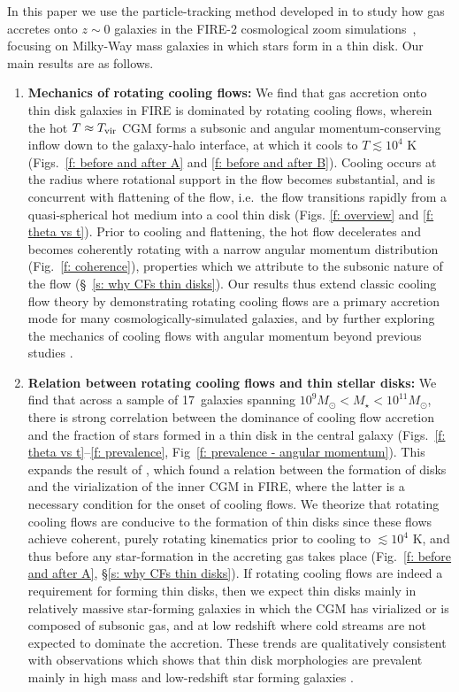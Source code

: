 \documentclass[fleqn,usenatbib]{mnras}
\newcommand{\Nsample}{17}
\begin{document}
In this paper we use the particle-tracking method developed in \cite{Hafen2019,Hafen2020} to study how gas accretes onto $z\sim0$ galaxies in the FIRE-2 cosmological zoom simulations~\citep{Hopkins2018}, focusing on Milky-Way mass galaxies in which stars form in a thin disk. 
Our main results are as follows.
\begin{enumerate}
    \item \textbf{Mechanics of rotating cooling flows:}
    We find that gas accretion onto thin disk galaxies in FIRE is dominated by rotating cooling flows, wherein the hot $T\approx T_{\rm vir}$ CGM forms a subsonic and angular momentum-conserving inflow down to the galaxy-halo interface, at which it cools to $T\lesssim10^4$ K (Figs.~\ref{f: before and after A} and \ref{f: before and after B}).
    Cooling occurs at the radius where rotational support in the flow becomes substantial, and is concurrent with flattening of the flow, i.e.~the flow transitions rapidly from a quasi-spherical hot medium into a cool thin disk (Figs. \ref{f: overview} and \ref{f: theta vs t}).
    Prior to cooling and flattening, the hot flow decelerates and becomes coherently rotating with a narrow angular momentum distribution (Fig.~\ref{f: coherence}), properties which we attribute to the subsonic nature of the flow (\S~\ref{s: why CFs thin disks}).
    Our results thus extend classic cooling flow theory by demonstrating rotating cooling flows are a primary accretion mode for many cosmologically-simulated galaxies, and by further exploring the mechanics of cooling flows with angular momentum beyond previous studies \citep{Cowie1980, Stern2019}. 
    \item \textbf{Relation between rotating cooling flows and thin stellar disks:}
    We find that across a sample of \Nsample~galaxies spanning $10^9 M_\odot < M_\star < 10^{11} M_\odot$, there is strong correlation between the dominance of cooling flow accretion and the fraction of stars formed in a thin disk in the central galaxy (Figs.~\ref{f: theta vs t}--\ref{f: prevalence}, Fig~\ref{f: prevalence - angular momentum}).
    This expands the result of \cite{Stern2021}, which found a relation between the formation of disks and the virialization of the inner CGM in FIRE, where the latter is a necessary condition for the onset of cooling flows. 
    We theorize that rotating cooling flows are conducive to the formation of thin disks since these flows achieve coherent, purely rotating kinematics prior to cooling to $\lesssim10^4$ K, and thus before any star-formation in the accreting gas takes place (Fig.~\ref{f: before and after A}, \S\ref{s: why CFs thin disks}).
    If rotating cooling flows are indeed a requirement for forming thin disks, then we expect thin disks mainly in relatively massive star-forming galaxies in which the CGM has virialized or is composed of subsonic gas, and at low redshift where cold streams are not expected to dominate the accretion.
    These trends are qualitatively consistent with observations which shows that thin disk morphologies are prevalent mainly in high mass and low-redshift star forming galaxies \citep{Kassin2012, Simons2017}. 
\end{enumerate}
\end{document}
